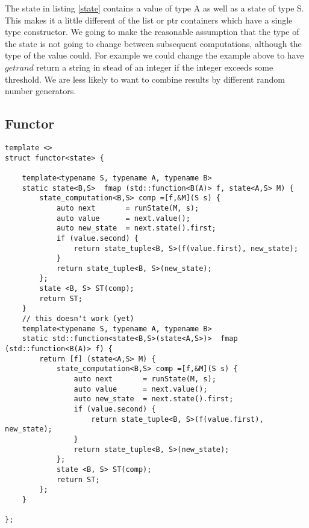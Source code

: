 \documentclass[12pt,fleqn]{article}
\begin{document}
The state in listing \ref{state} contains a value of type A as well as a state of type S.
This makes it a little different of the list or ptr containers which have a single type constructor.
We going to make the reasonable assumption that the type of the state is not going to change between subsequent computations, although the type of the
value could.
For example we could change the example above to have $getrand$ return a string in stead of an integer if the integer exceeds some threshold.
We are less likely to want to combine results by different random number generators.

%
%
\subsection{Functor}
%

%
%
%
\begin{minipage}{\linewidth}
\begin{lstlisting}[caption=State functor,label=statefunctor]
template <>
struct functor<state> {

	template<typename S, typename A, typename B>
	static state<B,S>  fmap (std::function<B(A)> f, state<A,S> M) {
		state_computation<B,S> comp =[f,&M](S s) {
			auto next       = runState(M, s);
			auto value      = next.value();
			auto new_state  = next.state().first;
			if (value.second) {
				return state_tuple<B, S>(f(value.first), new_state);
			}
			return state_tuple<B, S>(new_state);
		};
		state <B, S> ST(comp);
		return ST;	
	}
	// this doesn't work (yet)
	template<typename S, typename A, typename B>
	static std::function<state<B,S>(state<A,S>)>  fmap (std::function<B(A)> f) {
		return [f] (state<A,S> M) {
			state_computation<B,S> comp =[f,&M](S s) {
				auto next       = runState(M, s);
				auto value      = next.value();
				auto new_state  = next.state().first;
				if (value.second) {
					return state_tuple<B, S>(f(value.first), new_state);
				}
				return state_tuple<B, S>(new_state);
			};
			state <B, S> ST(comp);
			return ST;	
		};
	}

};
\end{lstlisting}
\end{minipage}
%
%
%
\end{document}
